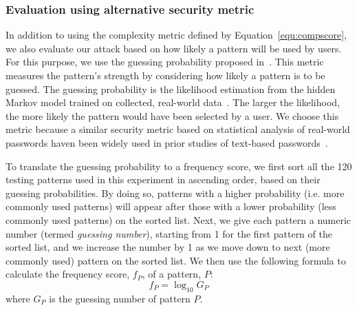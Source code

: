        \subsubsection{Evaluation using alternative security metric}
       \label{sec:eval_gussingp}
        In addition to using the complexity metric defined by Equation~\ref{equ:compscore}, we also evaluate our attack
        based on how likely a pattern will be used by users.  For this purpose, we use the
        guessing probability  proposed in~\cite{Heidt2016Refining}. This metric measures the pattern's strength by
        considering how likely a pattern is to be guessed. The guessing probability is the likelihood estimation from
        the hidden Markov model trained on collected, real-world data~\cite{uellenbeck2013quantifying}. The larger the
        likelihood, the more likely the pattern would have been
        selected by a user.  We choose this metric because a similar security metric
        based on statistical analysis of real-world passwords haven been widely used in prior studies of text-based
        passwords~\cite{Kelley:2012:GAM:2310656.2310715,Bonneau:2012:SGA:2310656.2310721}.

          To translate the guessing probability to a frequency score, we first sort all the 120 testing patterns used
          in this experiment in ascending order, based on their guessing probabilities. By doing so, patterns with a
          higher probability (i.e. more commonly used patterns) will appear after those with a lower probability (less commonly
          used patterns) on the sorted list. Next, we give each pattern a numeric number (termed \emph{guessing number}), starting from 1 for
          the first pattern of the sorted list, and we increase the number by 1 as we move down to next (more commonly used) pattern on the sorted list. We then use the following
          formula to calculate the frequency score, $f_{P}$, of a pattern, $P$:
        \begin{equation}
            f_{P}=\log_{10} {G_P}
            \label{equ:guessing_number}
        \end{equation}
        where $G_P$ is the guessing number of pattern $P$.


